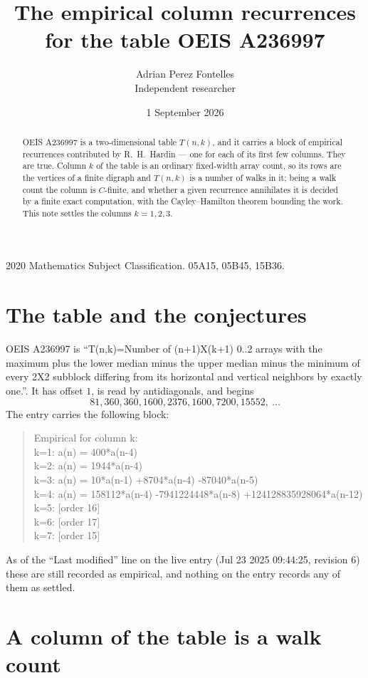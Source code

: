 \documentclass[11pt,a4paper]{article}
\title{The empirical column recurrences for the table OEIS A236997}
\author{Adrian Perez Fontelles\\ \small Independent researcher}
\date{1 September 2026}
\theoremstyle{plain}
\theoremstyle{definition}
\begin{document}
\maketitle

\begin{abstract}
OEIS A236997 is a two-dimensional table $T(n,k)$, and it carries a block of empirical
recurrences contributed by R.~H.~Hardin --- one for each of its first few columns. They are
true. Column $k$ of the table is an ordinary fixed-width array count, so its rows are the
vertices of a finite digraph and $T(n,k)$ is a number of walks in it; being a walk count the
column is $C$-finite, and whether a given recurrence annihilates it is decided by a finite
exact computation, with the Cayley--Hamilton theorem bounding the work. This note settles the columns $k=1, 2, 3$.
\end{abstract}

\noindent\small 2020 Mathematics Subject Classification. 05A15, 05B45, 15B36.\normalsize

\section{The table and the conjectures}

OEIS A236997 is ``T(n,k)=Number of (n+1)X(k+1) 0..2 arrays with the maximum plus the lower median minus the upper median minus the minimum of every 2X2 subblock differing from its horizontal and vertical neighbors by exactly one.''. It has offset $1$, is
read by antidiagonals, and begins
\[
81, 360, 360, 1600, 2376, 1600, 7200, 15552,\ \dots
\]
The entry carries the following block:
\begin{quote}\small
Empirical for column k:\\
k=1: a(n) = 400*a(n-4)\\
k=2: a(n) = 1944*a(n-4)\\
k=3: a(n) = 10*a(n-1) +8704*a(n-4) -87040*a(n-5)\\
k=4: a(n) = 158112*a(n-4) -7941224448*a(n-8) +124128835928064*a(n-12)\\
k=5: [order 16]\\
k=6: [order 17]\\
k=7: [order 15]\\
\end{quote}
As of the ``Last modified'' line on the live entry (Jul 23 2025 09:44:25, revision 6) these are still
recorded as empirical, and nothing on the entry records any of them as settled.

\section{A column of the table is a walk count}
\end{document}
